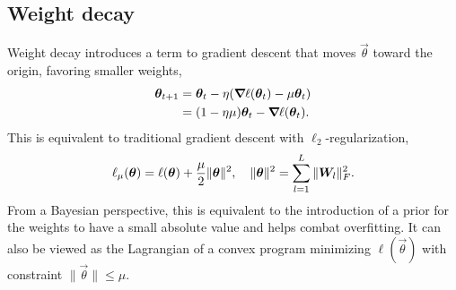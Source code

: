 \subsection{Weight decay}

Weight decay introduces a term to gradient descent that moves $\vec{\theta}$ toward the origin,
favoring smaller weights,
\begin{align*}
    \vec{\theta}_{t+1} & = \vec{\theta}_t - \eta \lft( \grad{\ell(\vec{\theta}_t)}{} - \mu \vec{\theta}_t \rgt) \\
                       & = \lft( 1-\eta\mu \rgt) \vec{\theta}_t - \grad{\ell(\vec{\theta}_t)}{}.
\end{align*}
This is equivalent to traditional gradient descent with $\ell_2$-regularization, \[
    \ell_{\mu}(\bm{\theta}) = \ell(\bm{\theta}) + \frac{\mu}{2} \| \bm{\theta} \|^2, \quad \| \bm{\theta} \|^2 = \sum_{l=1}^{L} \| \bm{W}_l \|_F^2.
\]
From a Bayesian perspective, this is equivalent to the introduction of a prior for the weights to
have a small absolute value and helps combat overfitting. It can also be viewed as the Lagrangian of a convex
program minimizing $\ell(\vec{\theta})$ with constraint $\| \vec{\theta} \| \leq \mu$.

